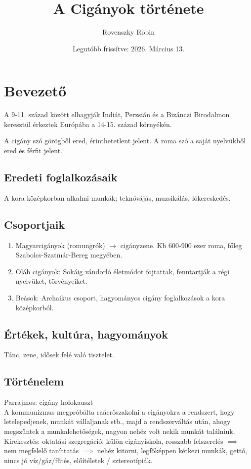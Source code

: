 \documentclass{article}
\title{A Cigányok története}
\author{Rovenszky Robin}
\date{Legutóbb frissítve: 2026. Március 13.}
\begin{document}
\maketitle
\tableofcontents
\newpage

\section{Bevezető}
A 9-11. század között elhagyják Indiát, Perzsián és a Bizánczi Birodalmon keresztül érkeztek Európába a 14-15. század környékén.

A cigány szó görögből ered, érinthetetlent jelent. A roma szó a saját nyelvükből ered és férfit jelent.

\subsection{Eredeti foglalkozásaik}
A kora középkorban alkalmi munkák; teknővájás, muzsikálás, lókereskedés.

\subsection{Csoportjaik}

\begin{enumerate}
    \item Magyarcigányok (romungrók) $\rightarrow$ cigányzene. Kb 600-900 ezer roma, főleg Szabolcs-Szatmár-Bereg megyében.
    \item Oláh cigányok: Sokáig vándorló életmódot fojtattak, fenntartják a régi nyelvüket, törvényeiket.
    \item Beások: Archaikus csoport, hagyományos cigány foglalkozások a kora középkorból. 
\end{enumerate}

\subsection{Értékek, kultúra, hagyományok}
Tánc, zene, idősek felé való tisztelet.

\subsection{Történelem}
Parrajmos: cigány holokauszt\\
A kommunizmus megpróbálta raáerőszakolni a cigányokra a rendszert, hogy letelepedjenek, munkát vállaljanak stb., majd a rendszerváltás után, ahogy megszűntek a munkalehetőségek, nagyon nehéz volt nekik munkát találniuk.\\

Kirekesztés: oktatási szegregáció; külön cigányiskola, rosszabb felszerelés $\implies$ nem megfelelő taníttatás $\implies$ nehéz kitörni, legfőképpen kétkezi munkák, gettó, nincs jó víz/gáz/fűtés, előítéletek / sztereotípiák.
\end{document}
